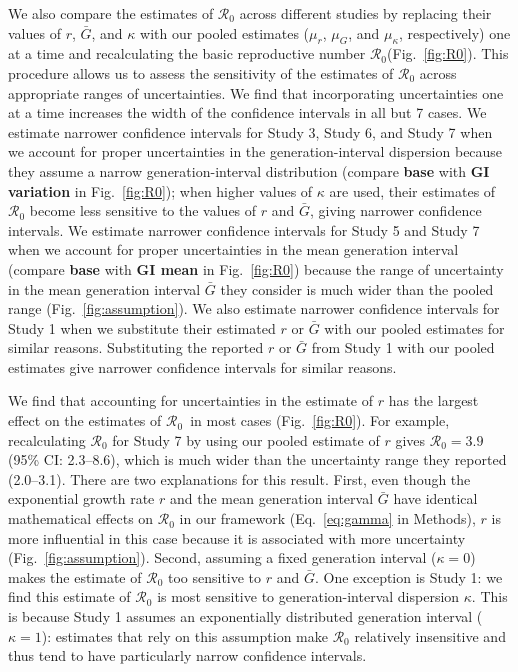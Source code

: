 \documentclass[12pt]{article}
\newcommand{\eref}[1]{Eq.~\ref{eq:#1}}
\newcommand{\fref}[1]{Fig.~\ref{fig:#1}}
\newcommand{\Ro}{\ensuremath{{\mathcal R}_{0}}\xspace}
\begin{document}
We also compare the estimates of \Ro across different studies by 
replacing their values of $r$, $\bar G$, and $\kappa$ with our pooled estimates ($\mu_r$, $\mu_G$, and $\mu_\kappa$, respectively) one at a time and recalculating the basic reproductive number \Ro (\fref{R0}).
This procedure allows us to assess the sensitivity of the estimates of \Ro across appropriate ranges of uncertainties.
We find that incorporating uncertainties one at a time increases the width of the confidence intervals in all but 7 cases.
We estimate narrower confidence intervals for Study 3, Study 6, and Study 7 when we account for proper uncertainties in the generation-interval dispersion because they assume a narrow generation-interval distribution (compare \textbf{base} with \textbf{GI variation} in \fref{R0});
when higher values of $\kappa$ are used, their estimates of \Ro become less sensitive to the values of $r$ and $\bar G$, giving narrower confidence intervals.
We estimate narrower confidence intervals for Study 5 and Study 7 when we account for proper uncertainties in the mean generation interval (compare \textbf{base} with \textbf{GI mean} in \fref{R0}) because the range of uncertainty in the mean generation interval $\bar G$ they consider is much wider than the pooled range (\fref{assumption}).
We also estimate narrower confidence intervals for Study 1 when we substitute their estimated $r$ or $\bar G$ with our pooled estimates for similar reasons.
Substituting the reported $r$ or $\bar G$ from Study 1 with our pooled estimates give narrower confidence intervals for similar reasons.

We find that accounting for uncertainties in the estimate of $r$ has the largest effect on the estimates of \Ro\ in most cases (\fref{R0}).
For example, recalculating \Ro for Study 7 by using our pooled estimate of $r$ gives $\Ro = 3.9$ (95\% CI: 2.3--8.6), which is much wider than the uncertainty range they reported (2.0--3.1).
There are two explanations for this result.
First, even though the exponential growth rate $r$ and the mean generation interval $\bar G$ have identical mathematical effects on \Ro in our framework (\eref{gamma} in Methods),
$r$ is more influential in this case because it is associated with more uncertainty (\fref{assumption}).
Second, assuming a fixed generation interval ($\kappa=0$) makes the estimate of \Ro too sensitive to $r$ and $\bar G$.
One exception is Study 1: we find this estimate of \Ro is most sensitive to generation-interval dispersion $\kappa$.
This is because Study 1 assumes an exponentially distributed generation interval ($\kappa=1$): estimates that rely on this assumption make \Ro relatively insensitive and thus tend to have particularly narrow confidence intervals.
\end{document}
